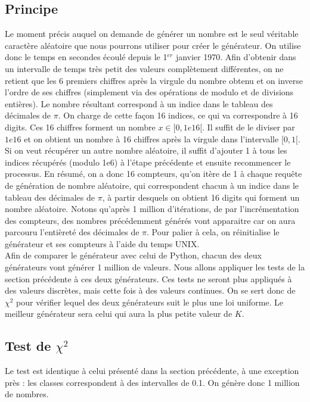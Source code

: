 \documentclass[10pt,a4paper]{article}
\begin{document}
\subsection{Principe}
Le moment précis auquel on demande de générer un nombre est le seul véritable caractère aléatoire que nous pourrons utiliser pour créer le générateur. On utilise donc le temps en secondes écoulé depuis le 1$^{er}$ janvier 1970. Afin d'obtenir dans un intervalle de temps très petit des valeurs complètement différentes, on ne retient que les 6 premiers chiffres après la virgule du nombre obtenu et on inverse l'ordre de ses chiffres (simplement via des opérations de modulo et de divisions entières). Le nombre résultant correspond à un indice dans le tableau des décimales de $\pi$. On charge de cette façon 16 indices, ce qui va correspondre à 16 digits. Ces 16 chiffres forment un nombre $x \in [0, 1e16[$. Il suffit de le diviser par $1e16$ et on obtient un nombre à 16 chiffres après la virgule dans l'intervalle $[0, 1[$. Si on veut récupérer un autre nombre aléatoire, il suffit d'ajouter 1 à tous les indices récupérés (modulo 1e6) à l'étape précédente et ensuite recommencer le processus. En résumé, on a donc 16 compteurs, qu'on itère de 1 à chaque requête de génération de nombre aléatoire, qui correspondent chacun à un indice dans le tableau des décimales de $\pi$, à partir desquels on obtient 16 digits qui forment un nombre aléatoire. Notons qu'après 1 million d'itérations, de par l'incrémentation des compteurs, des nombres précédemment générés vont apparaitre car on aura parcouru l'entièreté des décimales de $\pi$. Pour palier à cela, on réinitialise le générateur et ses compteurs à l'aide du temps UNIX.\\

Afin de comparer le générateur avec celui de Python, chacun des deux générateurs vont générer 1 million de valeurs. Nous allons appliquer les tests de la section précédente à ces deux générateurs. Ces tests ne seront plus appliqués à des valeurs discrètes, mais cette fois à des valeurs continues. On se sert donc de $\chi^2$ pour vérifier lequel des deux générateurs suit le plus une loi uniforme. Le meilleur générateur sera celui qui aura la plus petite valeur de $K$.

\subsection{Test de $\chi^2$}

Le test est identique à celui présenté dans la section précédente, à une exception près : les classes correspondent à des intervalles de 0.1. On génère donc 1 million de nombres.
\end{document}
